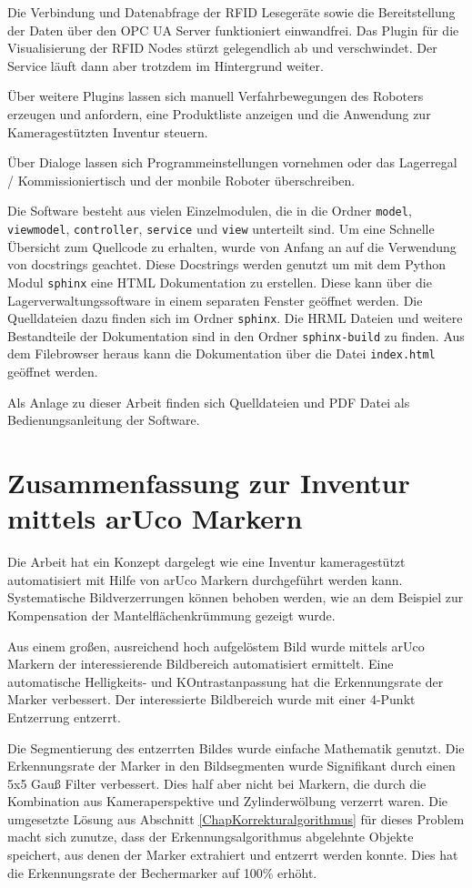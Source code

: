 Die Verbindung und Datenabfrage der RFID Lesegeräte sowie die Bereitstellung der Daten über den OPC UA Server funktioniert einwandfrei.
Das Plugin für die Visualisierung der RFID Nodes stürzt gelegendlich ab und verschwindet. Der Service läuft dann aber trotzdem im Hintergrund weiter.

Über weitere Plugins lassen sich manuell Verfahrbewegungen des Roboters erzeugen und anfordern, eine Produktliste anzeigen und die Anwendung zur Kameragestützten Inventur steuern.

Über Dialoge lassen sich Programmeinstellungen vornehmen oder das Lagerregal / Kommissioniertisch und der monbile Roboter überschreiben.

Die Software besteht aus vielen Einzelmodulen, die in die Ordner \verb|model|, \verb|viewmodel|, \verb|controller|, \verb|service| und \verb|view| unterteilt sind.
Um eine Schnelle Übersicht zum Quellcode zu erhalten, wurde von Anfang an auf die Verwendung von docstrings geachtet.
Diese Docstrings werden genutzt um mit dem Python Modul \verb|sphinx| eine HTML Dokumentation zu erstellen.
Diese kann über die Lagerverwaltungssoftware in einem separaten Fenster geöffnet werden. 
Die Quelldateien dazu finden sich im Ordner \verb|sphinx|. Die HRML Dateien und weitere Bestandteile der Dokumentation sind in den Ordner \verb|sphinx-build| zu finden.
Aus dem Filebrowser heraus kann die Dokumentation über die Datei \verb|index.html| geöffnet werden.

Als Anlage zu dieser Arbeit finden sich Quelldateien und PDF Datei als Bedienungsanleitung der Software.

\section{Zusammenfassung zur Inventur mittels arUco Markern}

Die Arbeit hat ein Konzept dargelegt wie eine Inventur kameragestützt automatisiert mit Hilfe von arUco Markern durchgeführt werden kann.
Systematische Bildverzerrungen können behoben werden, wie an dem Beispiel zur Kompensation der Mantelflächenkrümmung gezeigt wurde.

Aus einem großen, ausreichend hoch aufgelöstem Bild wurde mittels arUco Markern der interessierende Bildbereich automatisiert ermittelt. 
Eine automatische Helligkeits- und KOntrastanpassung hat die Erkennungsrate der Marker verbessert.
Der interessierte Bildbereich wurde mit einer 4-Punkt Entzerrung entzerrt.

Die Segmentierung des entzerrten Bildes wurde einfache Mathematik genutzt. 
Die Erkennungsrate der Marker in den Bildsegmenten wurde Signifikant durch einen 5x5 Gauß Filter verbessert. Dies half aber nicht 
bei Markern, die durch die Kombination aus Kameraperspektive und Zylinderwölbung verzerrt waren.
Die umgesetzte Lösung aus Abschnitt \ref{ChapKorrekturalgorithmus} für dieses Problem macht sich zunutze, dass der Erkennungsalgorithmus abgelehnte Objekte speichert, aus denen der Marker extrahiert und 
entzerrt werden konnte. 
Dies hat die Erkennungsrate der Bechermarker auf 100\% erhöht.

